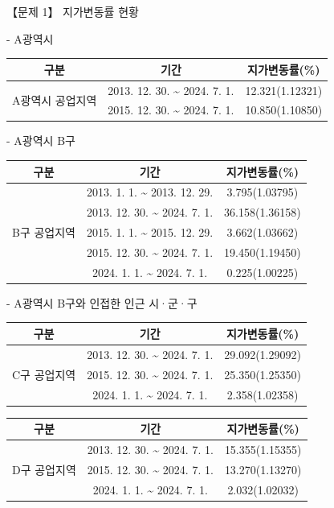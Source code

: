 \begin{longquestion}{【문제 1】}
\medskip{} 지가변동률 현황 \par
- A광역시 \par
{\small\centering
\begin{tabular}{|c|c|c|}
\hline
구분 & 기간 & 지가변동률(\%) \\
\hline
\multirow{2}{*}{A광역시 공업지역} & 2013. 12. 30. \textasciitilde{} 2024. 7. 1. & 12.321(1.12321) \\
\cline{2-3}
 & 2015. 12. 30. \textasciitilde{} 2024. 7. 1. & 10.850(1.10850) \\
\hline
\end{tabular}\par}

- A광역시 B구 \par
{\small\centering
\begin{tabular}{|c|c|c|}
\hline
구분 & 기간 & 지가변동률(\%) \\
\hline
\multirow{5}{*}{B구 공업지역} & 2013. 1. 1. \textasciitilde{} 2013. 12. 29. & 3.795(1.03795) \\
\cline{2-3}
 & 2013. 12. 30. \textasciitilde{} 2024. 7. 1. & 36.158(1.36158) \\
\cline{2-3}
 & 2015. 1. 1. \textasciitilde{} 2015. 12. 29. & 3.662(1.03662) \\
\cline{2-3}
 & 2015. 12. 30. \textasciitilde{} 2024. 7. 1. & 19.450(1.19450) \\
\cline{2-3}
 & 2024. 1. 1. \textasciitilde{} 2024. 7. 1. & 0.225(1.00225) \\
\hline
\end{tabular}\par}

- A광역시 B구와 인접한 인근 시·군·구 \par
{\small\centering
\begin{tabular}{|c|c|c|}
\hline
구분 & 기간 & 지가변동률(\%) \\
\hline
\multirow{3}{*}{C구 공업지역} & 2013. 12. 30. \textasciitilde{} 2024. 7. 1. & 29.092(1.29092) \\
\cline{2-3}
 & 2015. 12. 30. \textasciitilde{} 2024. 7. 1. & 25.350(1.25350) \\
\cline{2-3}
 & 2024. 1. 1. \textasciitilde{} 2024. 7. 1. & 2.358(1.02358) \\
\hline
\end{tabular}\par}

{\small\centering
\begin{tabular}{|c|c|c|}
\hline
구분 & 기간 & 지가변동률(\%) \\
\hline
\multirow{3}{*}{D구 공업지역} & 2013. 12. 30. \textasciitilde{} 2024. 7. 1. & 15.355(1.15355) \\
\cline{2-3}
 & 2015. 12. 30. \textasciitilde{} 2024. 7. 1. & 13.270(1.13270) \\
\cline{2-3}
 & 2024. 1. 1. \textasciitilde{} 2024. 7. 1. & 2.032(1.02032) \\
\hline
\end{tabular}\par}


\end{longquestion}
